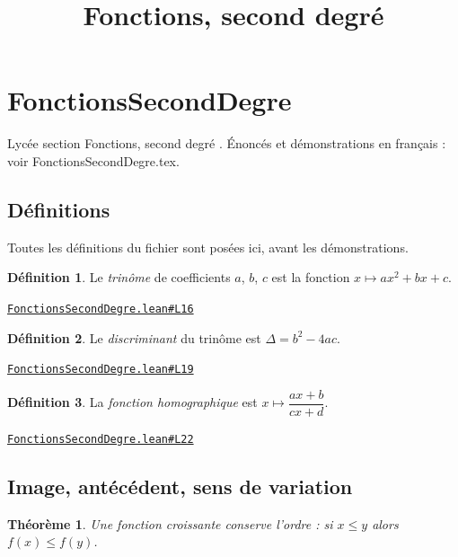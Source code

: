 \documentclass[11pt,a4paper]{article}
\title{Fonctions, second degré}
\date{}
\theoremstyle{definition}
\newtheorem{definition}{Définition}
\theoremstyle{plain}
\newtheorem{theoreme}{Théorème}
\newcommand{\source}[2]{\par\smallskip\noindent\hfill{\footnotesize\href{#1}{\texttt{#2}}}\par\smallskip}
\begin{document}
\maketitle
\sloppy

\section{FonctionsSecondDegre}

\noindent
Lycée \textemdash{} section \og{} Fonctions, second degré \fg{}.
Énoncés et démonstrations en français : voir FonctionsSecondDegre.tex.

\subsection{Définitions}

\noindent
Toutes les définitions du fichier sont posées ici, avant les démonstrations.

\begin{definition}
Le \emph{trinôme} de coefficients $a$, $b$, $c$ est la fonction
$x \mapsto ax^2 + bx + c$.
\end{definition}
\source{https://github.com/Commutator-IO/learn-lean/blob/main/cours/02-lycee/02-fonctions-second-degre/FonctionsSecondDegre.lean\#L16}{FonctionsSecondDegre.lean\#L16}

\begin{definition}
Le \emph{discriminant} du trinôme est $\Delta = b^2 - 4ac$.
\end{definition}
\source{https://github.com/Commutator-IO/learn-lean/blob/main/cours/02-lycee/02-fonctions-second-degre/FonctionsSecondDegre.lean\#L19}{FonctionsSecondDegre.lean\#L19}

\begin{definition}
La \emph{fonction homographique} est $x \mapsto \dfrac{ax + b}{cx + d}$.
\end{definition}
\source{https://github.com/Commutator-IO/learn-lean/blob/main/cours/02-lycee/02-fonctions-second-degre/FonctionsSecondDegre.lean\#L22}{FonctionsSecondDegre.lean\#L22}

\subsection{Image, antécédent, sens de variation}

\begin{theoreme}
Une fonction croissante conserve l'ordre : si $x \le y$ alors $f(x) \le f(y)$.
\end{theoreme}
\end{document}

